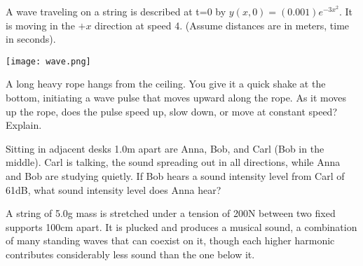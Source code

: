 \documentclass{exam}
\begin{document}
\begin{questions}

\question [30] A wave traveling on a string is described at t=0 by $y(x,0) = (0.001)e^{-3x^2}$. It is moving in the $+x$ direction at speed 4. (Assume distances are in meters, time in seconds).

\texttt{[image: wave.png]}

\clearpage


\question [10] A long heavy rope hangs from the ceiling. You give it a quick shake at the bottom, initiating a wave pulse that moves upward along the rope. As it moves up the rope, does the pulse speed up, slow down, or move at constant speed? Explain.

\question [15] Sitting in adjacent desks 1.0m apart are Anna, Bob, and Carl (Bob in the middle). Carl is talking, the sound spreading out in all directions, while Anna and Bob are studying quietly. If Bob hears a sound intensity level from Carl of 61dB, what sound intensity level does Anna hear?
\clearpage


\question [25] A string of 5.0g mass is stretched under a tension of 200N between two fixed supports 100cm apart. It is plucked and produces a musical sound, a combination of many standing waves that can coexist on it, though each higher harmonic contributes considerably less sound than the one below it.
\begin{parts}

\end{parts}
\end{questions}
\end{document}
